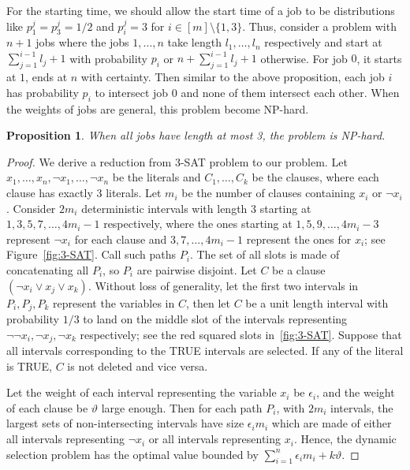 \documentclass{article}
\newtheorem{proposition}[theorem]{Proposition}
\begin{document}
For the starting time, we should allow the start time of a job to be distributions like $p_1^j = p_3^j=1/2$ and $p_i^j=3$ for $i\in [m]\setminus\{1,3\}$. 
Thus, consider a problem with $n+1$ jobs where the jobs $1,\ldots,n$ take length $l_1,\ldots,l_n$ respectively and start at $\sum_{j=1}^{i-1}l_{j}+1$ with probability $p_i$ or $n+\sum_{j=1}^{i-1}l_{j}+1$ otherwise.
For job $0$, it starts at $1$, ends at $n$ with certainty.
Then similar to the above proposition, each job $i$ has probability $p_i$ to intersect job $0$ and none of them intersect each other. 
When the weights of jobs are general, this problem become NP-hard.
\begin{proposition}
    When all jobs have length at most 3, the problem is NP-hard.
\end{proposition}
\begin{proof}
    We derive a reduction from 3-SAT problem to our problem.
    Let $x_1,\ldots,x_n, \neg x_1,\ldots,\neg x_n$ be the literals and $C_1,\ldots, C_k$ be the clauses, where each clause has exactly $3$ literals.
    Let $m_i$ be the number of clauses containing $x_i$ or $\neg x_i$.
    Consider $2m_i$ deterministic intervals with length $3$ starting at $1,3,5,7,\ldots,4m_i-1$ respectively, where the ones starting at $1,5,9,\ldots, 4m_i-3$ represent $\neg x_i$ for each clause and $3,7,\ldots, 4m_i-1$ represent the ones for $x_i$; see Figure~\ref{fig:3-SAT}. 
    Call such paths $P_i$.
    The set of all slots is made of concatenating all $P_i$, so $P_i$ are pairwise disjoint.
    Let $C$ be a clause $(\neg x_i\lor x_j \lor x_k)$. 
    Without loss of generality, let the first two intervals in $P_i,P_j,P_k$ represent the variables in $C$, then let $C$ be a unit length interval with probability $1/3$ to land on the middle slot of the intervals representing $\neg \neg x_i, \neg x_j,\neg x_k$ respectively; see the red squared slots in~\ref{fig:3-SAT}.
    Suppose that all intervals corresponding to the TRUE intervals are selected.
    If any of the literal is TRUE, $C$ is not deleted and vice versa.

    Let the weight of each interval representing the variable $x_i$ be $\epsilon_i$, and the weight of each clause be $\vartheta$ large enough.
    Then for each path $P_i$, with $2m_i$ intervals, the largest sets of non-intersecting intervals have size $\epsilon_im_i$ which are made of either all intervals representing $\neg x_i$ or all intervals representing $x_i$.
    Hence, the dynamic selection problem has the optimal value bounded by $\sum_{i=1}^{n}\epsilon_im_i+k\vartheta$.


\end{proof}
\end{document}
